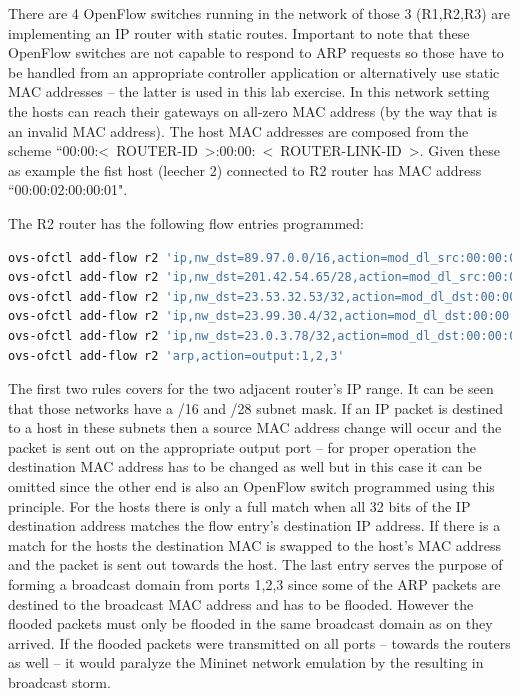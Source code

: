 \documentclass[a4paper]{article}
\begin{document}
There are 4 OpenFlow switches running in the network of those 3 (R1,R2,R3) are implementing an IP router with static
routes. Important to note that these OpenFlow switches are not capable to respond to ARP requests so those have to be
handled from an appropriate controller application or alternatively use static MAC addresses -- the latter is used in
this lab exercise. In this network setting the hosts can reach their gateways on all-zero MAC address (by the way that
is an invalid MAC address). The host MAC addresses are composed from the scheme
``00:00:\textless~ROUTER-ID~\textgreater:00:00:~\textless~ROUTER-LINK-ID~\textgreater. Given these as example the fist
host (leecher 2) connected to R2 router has
MAC address ``00:00:02:00:00:01".

The R2 router has the following flow entries programmed:

\begin{lstlisting}[language=bash,frame=single,breaklines,caption={R2 router flow entry configuration},label=lst:R2-flow-config]
ovs-ofctl add-flow r2 'ip,nw_dst=89.97.0.0/16,action=mod_dl_src:00:00:00:00:00:00,output:4'
ovs-ofctl add-flow r2 'ip,nw_dst=201.42.54.65/28,action=mod_dl_src:00:00:00:00:00:00,output:5'
ovs-ofctl add-flow r2 'ip,nw_dst=23.53.32.53/32,action=mod_dl_dst:00:00:02:00:00:01,output:1'
ovs-ofctl add-flow r2 'ip,nw_dst=23.99.30.4/32,action=mod_dl_dst:00:00:02:00:00:02,output:2'
ovs-ofctl add-flow r2 'ip,nw_dst=23.0.3.78/32,action=mod_dl_dst:00:00:02:00:00:03,output:3'
ovs-ofctl add-flow r2 'arp,action=output:1,2,3' 
\end{lstlisting}

The first two rules covers for the two adjacent router's IP range. It can be seen that those networks have a /16 and
/28 subnet mask. If an IP packet is destined to a host in these subnets then a source MAC address change will occur and
the packet is sent out on the appropriate output port -- for proper operation the destination MAC address has to be
changed as well but in this case it can be omitted since the other end is also an OpenFlow switch programmed using this
principle.
For the hosts there is only a full match when all 32 bits of the IP destination address matches the flow entry's
destination IP address. If there is a match for the hosts the destination MAC is swapped to the host's MAC address and
the packet is sent out towards the host. The last entry serves the purpose of forming a broadcast domain from ports
1,2,3 since some of the ARP packets are destined to the broadcast MAC address and has to be flooded. However the
flooded packets must only be flooded in the same broadcast domain as on they arrived. If the flooded packets were
transmitted on all ports  -- towards the routers as well -- it would paralyze the Mininet network emulation by the
resulting in broadcast storm.
\end{document}
